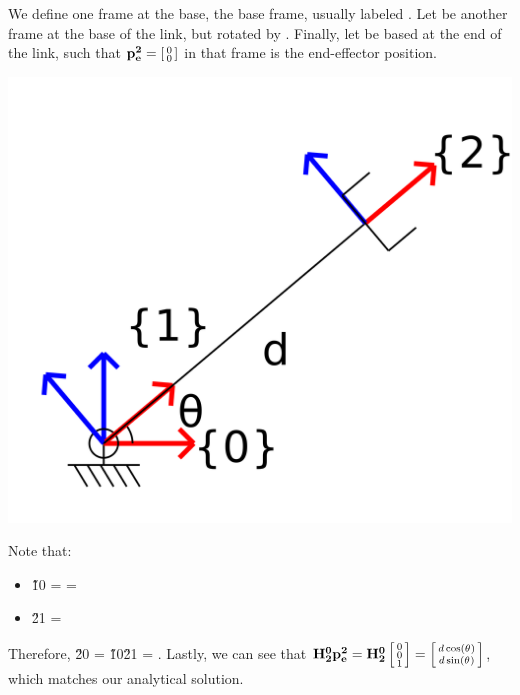 \documentclass{16384_doc}
\begin{document}
We define one frame at the base, the base frame, usually labeled .
Let  be another frame at the base of the link, but rotated by \th.
Finally, let  be based at the end of the link, such that
$\mathbf{p_{e}^{2}} = \left[\begin{smallmatrix}0\\0\end{smallmatrix}\right]$ in that frame is the end-effector position.

\begin{center}
\includegraphics[scale=0.08]{generated_figures/bg_r_robot_frames.png}
\end{center}

Note that:

\begin{itemize}
    \item \H{1}{0} =  =
    \item \H{2}{1} = 
\end{itemize}

Therefore, \H{2}{0} = \H{1}{0}\H{2}{1} = . Lastly, we can see that
$\mathbf{H_{2}^{0}} \mathbf{p_{e}^{2}} = \mathbf{H_{2}^{0}} \left[\begin{smallmatrix}0\\0\\1\end{smallmatrix}\right] = \left[\begin{smallmatrix}d \cos(\theta_{})\\d \sin(\theta_{})\end{smallmatrix}\right]$, which matches our analytical solution.
\end{document}
